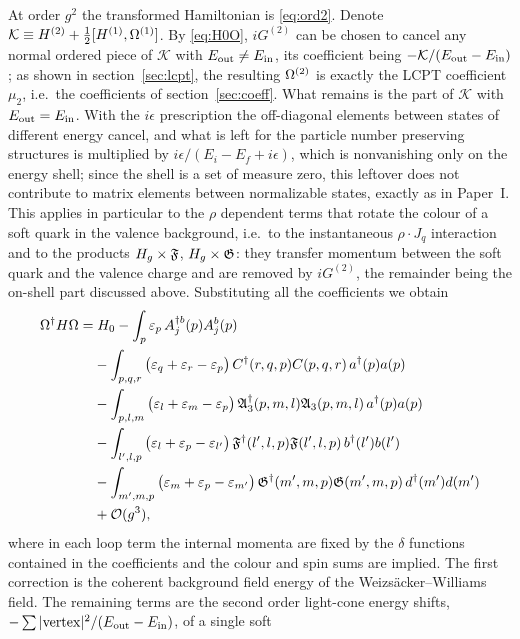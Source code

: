 At order $g^{2}$ the transformed Hamiltonian is \eqref{eq:ord2}. Denote
$\mathcal K\equiv H^{(2)}+\tfrac12[H^{(1)},\Omega^{(1)}]$. By \eqref{eq:H0O}, $iG^{(2)}$ can be chosen to
cancel any normal ordered piece of $\mathcal K$ with $E_{\rm out}\neq E_{\rm in}$, its coefficient being
$-\mathcal K/(E_{\rm out}-E_{\rm in})$; as shown in section~\ref{sec:lcpt}, the resulting $\Omega^{(2)}$ is
exactly the LCPT coefficient $\mu_{2}$, i.e.\ the coefficients of section~\ref{sec:coeff}. What
remains is the part of $\mathcal K$ with $E_{\rm out}=E_{\rm in}$. With the $i\epsilon$ prescription the
off-diagonal elements between states of different energy cancel, and what is left for the particle
number preserving structures is multiplied by $i\epsilon/(E_{i}-E_{f}+i\epsilon)$, which is
nonvanishing only on the energy shell; since the shell is a set of measure zero, this leftover does
not contribute to matrix elements between normalizable states, exactly as in Paper~I. This applies
in particular to the $\rho$ dependent terms that rotate the colour of a soft quark in the valence
background, i.e.\ to the instantaneous $\rho\cdot J_{q}$ interaction and to the products $H_{g}\times\mathfrak{F}$,
$H_{g}\times\mathfrak{G}$: they transfer momentum between the soft quark and the valence charge and are removed
by $iG^{(2)}$, the remainder being the on-shell part discussed above. Substituting all the
coefficients we obtain
\begin{align}
\Omega^{\dagger}H\Omega=&\;H_{0}-\int_{p}\varepsilon_{p}\,A^{\dagger b}_{j}(p)A^{b}_{j}(p)
\nonumber\\
&-\int_{p,q,r}\big(\varepsilon_{q}+\varepsilon_{r}-\varepsilon_{p}\big)\,C^{\dagger}(r,q,p)C(p,q,r)\,a^{\dagger}(p)a(p)
\nonumber\\
&-\int_{p,l,m}\big(\varepsilon_{l}+\varepsilon_{m}-\varepsilon_{p}\big)\,\mathfrak{A}_{3}^{\dagger}(p,m,l)\mathfrak{A}_{3}(p,m,l)\,a^{\dagger}(p)a(p)
\nonumber\\
&-\int_{l',l,p}\big(\varepsilon_{l}+\varepsilon_{p}-\varepsilon_{l'}\big)\,\mathfrak{F}^{\dagger}(l',l,p)\mathfrak{F}(l',l,p)\,b^{\dagger}(l')b(l')
\nonumber\\
&-\int_{m',m,p}\big(\varepsilon_{m}+\varepsilon_{p}-\varepsilon_{m'}\big)\,\mathfrak{G}^{\dagger}(m',m,p)\mathfrak{G}(m',m,p)\,d^{\dagger}(m')d(m')
\nonumber\\
&+\mathcal{O}(g^{3}) ,
\label{eq:diag2}
\end{align}
where in each loop term the internal momenta are fixed by the $\delta$ functions contained in the
coefficients and the colour and spin sums are implied. The first correction is the coherent
background field energy of the Weizs\"acker--Williams field. The remaining terms are the second
order light-cone energy shifts, $-\sum|{\rm vertex}|^{2}/(E_{\rm out}-E_{\rm in})$, of a single soft
